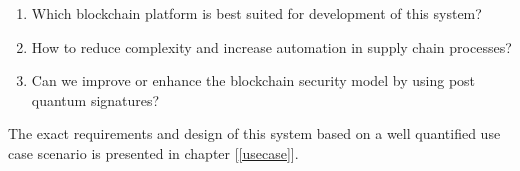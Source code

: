 \begin{enumerate}[label=(\alph*)]
\item Which blockchain platform is best suited for development of this system?
\item How to reduce complexity and increase automation in supply chain processes?
\item Can we improve or enhance the blockchain security model by using post quantum signatures?
\end{enumerate}
	
The exact requirements and design of this system based on a well quantified use case scenario is presented in chapter [\ref{usecase}]. 


